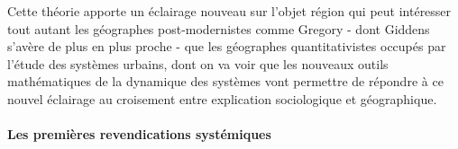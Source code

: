 
Cette théorie apporte un éclairage nouveau sur l'objet région qui peut intéresser tout autant les géographes post-modernistes comme Gregory - dont Giddens s'avère de plus en plus proche - que les géographes quantitativistes occupés par l'étude des systèmes urbains, dont on va voir que les nouveaux outils mathématiques de la dynamique des systèmes vont permettre de répondre à ce nouvel éclairage au croisement entre explication sociologique et géographique.






\paragraph{Les premières revendications systémiques}

